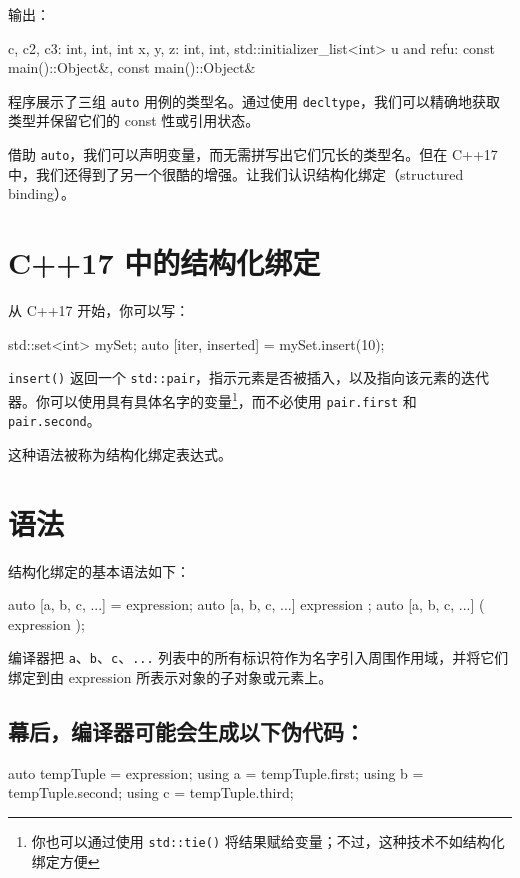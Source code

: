 输出：

\begin{codebox}[cpp]
c, c2, c3: int, int, int
x, y, z: int, int, std::initializer_list<int>
u and refu: const main()::Object&, const main()::Object&
\end{codebox}

程序展示了三组 \texttt{auto} 用例的类型名。通过使用 \texttt{decltype}，我们可以精确地获取类型并保留它们的 const 性或引用状态。

借助 \texttt{auto}，我们可以声明变量，而无需拼写出它们冗长的类型名。但在 C++17 中，我们还得到了另一个很酷的增强。让我们认识结构化绑定（structured binding）。

\section{C++17 中的结构化绑定}

从 C++17 开始，你可以写：

\begin{codebox}[cpp]
std::set<int> mySet;
auto [iter, inserted] = mySet.insert(10);
\end{codebox}

\texttt{insert()} 返回一个 \texttt{std::pair}，指示元素是否被插入，以及指向该元素的迭代器。你可以使用具有具体名字的变量\footnote{你也可以通过使用 \texttt{std::tie()} 将结果赋给变量；不过，这种技术不如结构化绑定方便}，而不必使用 \texttt{pair.first} 和 \texttt{pair.second}。

这种语法被称为结构化绑定表达式。

\section{语法}

结构化绑定的基本语法如下：

\begin{codebox}[cpp]
auto [a, b, c, ...] = expression;
auto [a, b, c, ...] { expression };
auto [a, b, c, ...] ( expression );
\end{codebox}

编译器把 \texttt{a}、\texttt{b}、\texttt{c}、\texttt{...} 列表中的所有标识符作为名字引入周围作用域，并将它们绑定到由 expression 所表示对象的子对象或元素上。

\subsection{幕后，编译器可能会生成以下伪代码：}

\begin{codebox}[cpp]
auto tempTuple = expression;
using a = tempTuple.first;
using b = tempTuple.second;
using c = tempTuple.third;
\end{codebox}

